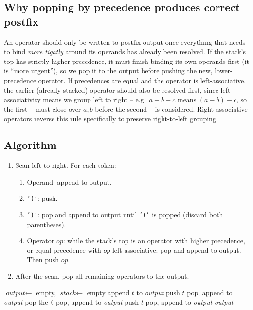 \subsection*{Why popping by precedence produces correct postfix}

An operator should only be written to postfix output once everything that
needs to bind \emph{more tightly} around its operands has already been
resolved. If the stack's top has strictly higher precedence, it must
finish binding its own operands first (it is ``more urgent''), so we pop
it to the output before pushing the new, lower-precedence operator. If
precedences are equal and the operator is left-associative, the earlier
(already-stacked) operator should also be resolved first, since
left-associativity means we group left to right -- e.g.\ $a-b-c$ means
$(a-b)-c$, so the first \texttt{-} must close over $a,b$ before the second
\texttt{-} is considered. Right-associative operators reverse this rule
specifically to preserve right-to-left grouping.

\subsection*{Algorithm}

\begin{enumerate}
  \item Scan left to right. For each token:
  \begin{enumerate}
    \item Operand: append to output.
    \item \texttt{'('}: push.
    \item \texttt{')'}: pop and append to output until \texttt{'('} is
          popped (discard both parentheses).
    \item Operator $op$: while the stack's top is an operator with
          higher precedence, or equal precedence with $op$
          left-associative: pop and append to output. Then push $op$.
  \end{enumerate}
  \item After the scan, pop all remaining operators to the output.
\end{enumerate}

\begin{algorithm}[H]
\caption{Infix to Postfix}
\begin{algorithmic}[1]
  \State $\textit{output} \gets$ empty, $\textit{stack} \gets$ empty
     append $t$ to \textit{output}
     push $t$
       pop, append to \textit{output} \EndWhile
      \State pop the \texttt{(}
    \Else
        \State pop, append to \textit{output}
      \EndWhile
      \State push $t$
    \EndIf
  \EndFor
   pop, append to \textit{output} \EndWhile
  \State \Return \textit{output}
\EndProcedure
\end{algorithmic}
\end{algorithm}

